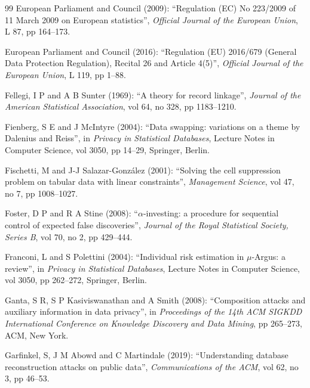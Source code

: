\documentclass[11pt,a4paper]{article}
\theoremstyle{plain}
\theoremstyle{definition}
\theoremstyle{definition}
\theoremstyle{plain}
\begin{document}
\begin{thebibliography}{99}
European Parliament and Council (2009): ``Regulation (EC) No 223/2009 of 11 March 2009 on European statistics'', \emph{Official Journal of the European Union}, L 87, pp 164--173.

European Parliament and Council (2016): ``Regulation (EU) 2016/679 (General Data Protection Regulation), Recital 26 and Article 4(5)'', \emph{Official Journal of the European Union}, L 119, pp 1--88.

Fellegi, I P and A B Sunter (1969): ``A theory for record linkage'', \emph{Journal of the American Statistical Association}, vol 64, no 328, pp 1183--1210.

Fienberg, S E and J McIntyre (2004): ``Data swapping: variations on a theme by Dalenius and Reiss'', in \emph{Privacy in Statistical Databases}, Lecture Notes in Computer Science, vol 3050, pp 14--29, Springer, Berlin.

Fischetti, M and J-J Salazar-Gonz\'alez (2001): ``Solving the cell suppression problem on tabular data with linear constraints'', \emph{Management Science}, vol 47, no 7, pp 1008--1027.

Foster, D P and R A Stine (2008): ``$\alpha$-investing: a procedure for sequential control of expected false discoveries'', \emph{Journal of the Royal Statistical Society, Series B}, vol 70, no 2, pp 429--444.

Franconi, L and S Polettini (2004): ``Individual risk estimation in $\mu$-Argus: a review'', in \emph{Privacy in Statistical Databases}, Lecture Notes in Computer Science, vol 3050, pp 262--272, Springer, Berlin.

Ganta, S R, S P Kasiviswanathan and A Smith (2008): ``Composition attacks and auxiliary information in data privacy'', in \emph{Proceedings of the 14th ACM SIGKDD International Conference on Knowledge Discovery and Data Mining}, pp 265--273, ACM, New York.

Garfinkel, S, J M Abowd and C Martindale (2019): ``Understanding database reconstruction attacks on public data'', \emph{Communications of the ACM}, vol 62, no 3, pp 46--53.


\end{thebibliography}
\end{document}
